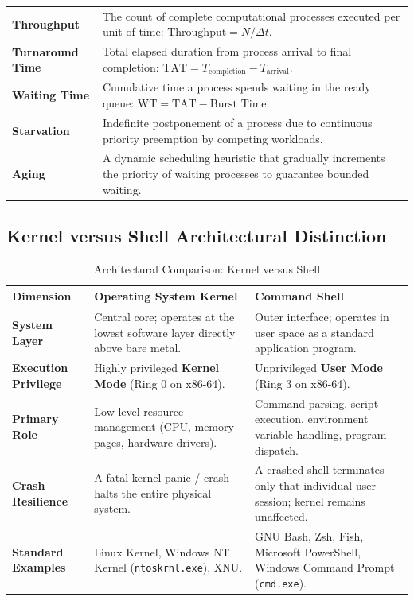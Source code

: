 \begin{table}[htbp]
\begin{tabularx}{\textwidth}{l X}
\textbf{Throughput} & The count of complete computational processes executed per unit of time: $\text{Throughput} = N / \Delta t$. \\
\textbf{Turnaround Time} & Total elapsed duration from process arrival to final completion: $\text{TAT} = T_{\text{completion}} - T_{\text{arrival}}$. \\
\textbf{Waiting Time} & Cumulative time a process spends waiting in the ready queue: $\text{WT} = \text{TAT} - \text{Burst Time}$. \\
\textbf{Starvation} & Indefinite postponement of a process due to continuous priority preemption by competing workloads. \\
\textbf{Aging} & A dynamic scheduling heuristic that gradually increments the priority of waiting processes to guarantee bounded waiting. \\
\bottomrule
\end{tabularx}
\end{table}

\subsection{Kernel versus Shell Architectural Distinction}
\begin{table}[htbp]
\centering
\small
\caption{Architectural Comparison: Kernel versus Shell}
\label{tab:kernel_vs_shell}
\begin{tabularx}{\textwidth}{p{3.2cm} X X}
\toprule
\textbf{Dimension} & \textbf{Operating System Kernel} & \textbf{Command Shell} \\
\midrule
\textbf{System Layer} & Central core; operates at the lowest software layer directly above bare metal. & Outer interface; operates in user space as a standard application program. \\
\textbf{Execution Privilege} & Highly privileged \textbf{Kernel Mode} (Ring 0 on x86-64). & Unprivileged \textbf{User Mode} (Ring 3 on x86-64). \\
\textbf{Primary Role} & Low-level resource management (CPU, memory pages, hardware drivers). & Command parsing, script execution, environment variable handling, program dispatch. \\
\textbf{Crash Resilience} & A fatal kernel panic / crash halts the entire physical system. & A crashed shell terminates only that individual user session; kernel remains unaffected. \\
\textbf{Standard Examples} & Linux Kernel, Windows NT Kernel (\texttt{ntoskrnl.exe}), XNU. & GNU Bash, Zsh, Fish, Microsoft PowerShell, Windows Command Prompt (\texttt{cmd.exe}). \\
\bottomrule
\end{tabularx}
\end{table}

